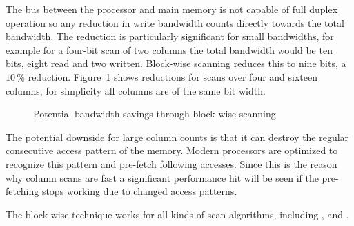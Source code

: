 The bus between the processor and main memory is not capable of full duplex
operation so any reduction in write bandwidth counts directly towards the total
bandwidth. The reduction is particularly significant for small bandwidths, for
example for a four-bit scan of two columns the total bandwidth would be ten
bits, eight read and two written. Block-wise scanning reduces this to nine
bits, a $10\,\%$ reduction. Figure~\ref{fig:blockwisesavings} shows reductions
for scans over four and sixteen columns, for simplicity all columns are of the
same bit width.

\begin{figure}[h] \center
{}
\caption{Potential bandwidth savings through block-wise scanning}
\label{fig:blockwisesavings}
\end{figure}

The potential downside for large column counts is that it can destroy the
regular consecutive access pattern of the memory. Modern processors are
optimized to recognize this pattern and pre-fetch following accesses. Since
this is the reason why column scans are fast a significant performance hit will
be seen if the pre-fetching stops working due to changed access patterns.

The block-wise technique works for all kinds of scan algorithms, including
\simdscan{}, \bwv{} and \bs{}.
